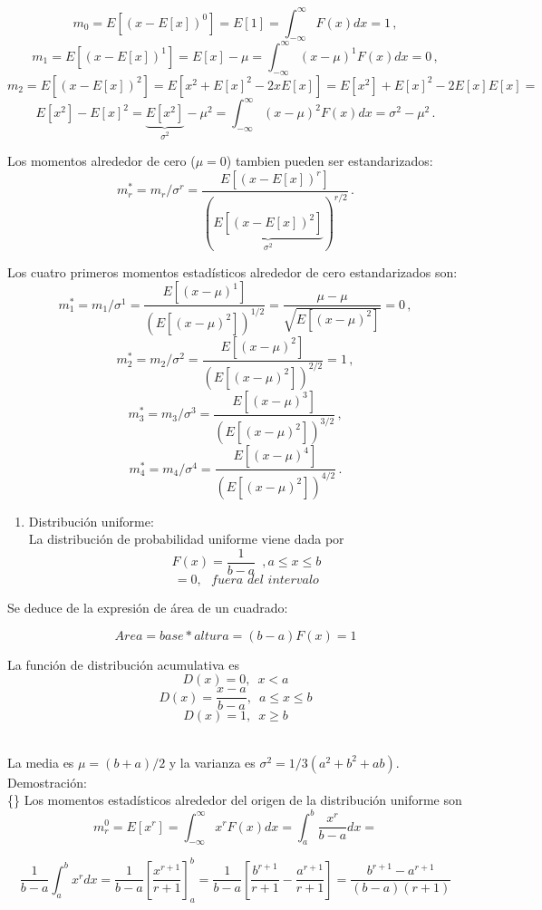 \documentclass[
]{agujournal2019}
\providecommand{\tightlist}{%
  \setlength{\itemsep}{0pt}\setlength{\parskip}{0pt}}\usepackage{longtable,booktabs,array}
\begin{document}
\[m_0=E[(x-E[x])^0]=E[1]=\int^{\infty}_{-\infty}F(x)dx=1\,,\]
\[m_1=E[(x-E[x])^1]=E[x]-\mu=\int^{\infty}_{-\infty} (x-\mu)^1 F(x)dx=0\,,\]
\[m_2=E[(x-E[x])^2]=E[x^2 + E[x]^2 -2xE[x]]=
      E[x^2]+E[x]^2-2E[x]E[x]=\]
\[E[x^2]-E[x]^2=\underbrace{E[x^2]}_{\sigma^2}-\mu^2=\int^{\infty}_{-\infty} (x-\mu)^2 F(x)dx=\sigma^2-\mu^2\,.\]

Los momentos alrededor de cero (\(\mu=0\)) tambien pueden ser
estandarizados:
\[m^*_r=m_r/\sigma^r=\frac{E[(x-E[x])^r]}{(\underbrace{E[(x-E[x])^2]}_{\sigma^2})^{r/2}}\,.\]

Los cuatro primeros momentos estadísticos alrededor de cero
estandarizados son:
\[m^*_1=m_1/\sigma^1=\frac{E[(x-\mu)^1]}{(E[(x-\mu)^2])^{1/2}}=\frac{\mu-\mu}{\sqrt{E[(x-\mu)^2]}}=0\,,\]
\[m^*_2=m_2/\sigma^2=\frac{E[(x-\mu)^2]}{(E[(x-\mu)^2])^{2/2}}=1\,,\]
\[m^*_3=m_3/\sigma^3=\frac{E[(x-\mu)^3]}{(E[(x-\mu)^2])^{3/2}}\,,\]
\[m^*_4=m_4/\sigma^4=\frac{E[(x-\mu)^4]}{(E[(x-\mu)^2])^{4/2}}\,.\]

\vspace{0.5cm}

\begin{enumerate}
\def\labelenumi{\arabic{enumi}.}
\tightlist
\item
  Distribución uniforme:\\
  La distribución de probabilidad uniforme viene dada por
  \[F(x)=\frac{1}{b-a}\,\,\,, a \le x \le b\]
  \[=0,\,\,\,\,fuera\,\,del\,\,intervalo\]
\end{enumerate}

Se deduce de la expresión de área de un cuadrado:

\[Area=base*altura=(b-a)F(x)=1\]

La función de distribución acumulativa es \[D(x)=0,\,\,\,x<a\]
\[D(x)=\frac{x-a}{b-a},\,\,\,a \le x \le b\] \[D(x)=1,\,\,\,x \ge b\]\\

\begin{center}
\end{center}

La media es \(\mu=(b+a)/2\) y la varianza es
\(\sigma^2=1/3(a^2 + b^2 +ab)\). Demostración:\\

\{\noindent\} Los momentos estadísticos alrededor del origen de la
distribución uniforme son
\[m^0_r=E[x^r]=\int^{\infty}_{-\infty} x^rF(x)dx=\int^{b}_{a} \frac{x^r}{b-a}dx=\]

\[\frac{1}{b-a}\int^{b}_{a}x^r dx=\frac{1}{b-a}\left[\frac{x^{r+1}}{r+1}\right]^b_a=
      \frac{1}{b-a}\left[\frac{b^{r+1}}{r+1}-\frac{a^{r+1}}{r+1}\right]=\frac{b^{r+1}-a^{r+1}}{(b-a)(r+1)}\]
\end{document}
